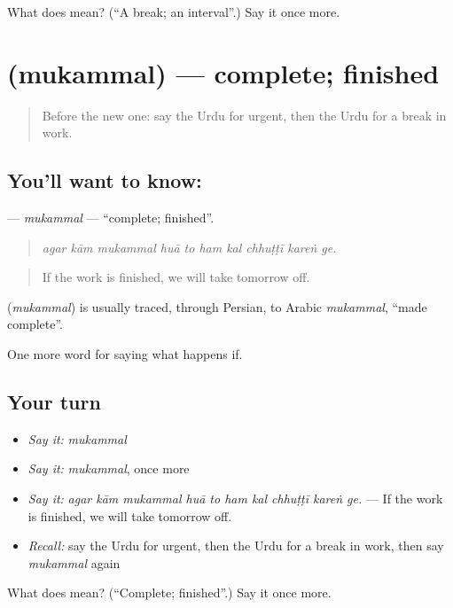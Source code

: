 \begin{tcolorbox}[breakable,colback=teal!4,colframe=teal!35!black,title={Before you move on}]
What does  mean? (\textquotedblleft{}A break; an interval\textquotedblright{}.) Say it once more.
\end{tcolorbox}
\section[\texorpdfstring{\ur{مکمل} (mukammal)}{مکمل (mukammal)}]{ (mukammal) — complete; finished}

\label{lesson:UR-C526-mukammal}



\begin{quote}
Before the new one: say the Urdu for urgent, then the Urdu for a break in work.
\end{quote}

\subsection*{You'll want to know: }
\textbf{} — \emph{mukammal} — \textquotedblleft{}complete; finished\textquotedblright{}.

\begin{quote}
         
\end{quote}

\begin{quote}
\emph{agar kām mukammal huā to ham kal chhuṭṭī kareṅ ge.}
\end{quote}

\begin{quote}
If the work is finished, we will take tomorrow off.
\end{quote}

\begin{cousinweb}
\textbf{} (\emph{mukammal}) is usually traced, through Persian, to Arabic \emph{mukammal}, \textquotedblleft{}made complete\textquotedblright{}.
\end{cousinweb}

\begin{grammarlens}[title={What you've built}]
One more word for saying what happens if.
\end{grammarlens}

\subsection*{Your turn}
\begin{itemize}
\raggedright
  \item \emph{Say it:} \emph{mukammal}
  \item \emph{Say it:} \emph{mukammal}, once more
  \item \emph{Say it:} \emph{agar kām mukammal huā to ham kal chhuṭṭī kareṅ ge.} — If the work is finished, we will take tomorrow off.
  \item \emph{Recall:} say the Urdu for urgent, then the Urdu for a break in work, then say \emph{mukammal} again
\end{itemize}

\begin{tcolorbox}[breakable,colback=teal!4,colframe=teal!35!black,title={Before you move on}]
What does  mean? (\textquotedblleft{}Complete; finished\textquotedblright{}.) Say it once more.
\end{tcolorbox}
